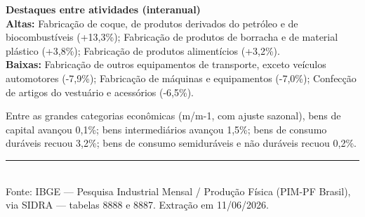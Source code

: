 \documentclass[11pt,a4paper]{article}
\begin{document}
\vspace{0.4em}
{\color{azulpim}\textbf{Destaques entre atividades (interanual)}}\\
\textbf{Altas:} Fabricação de coque, de produtos derivados do petróleo e de biocombustíveis (+13,3\%); Fabricação de produtos de borracha e de material plástico (+3,8\%); Fabricação de produtos alimentícios (+3,2\%).\\
\textbf{Baixas:} Fabricação de outros equipamentos de transporte, exceto veículos automotores (-7,9\%); Fabricação de máquinas e equipamentos (-7,0\%); Confecção de artigos do vestuário e acessórios (-6,5\%).

\vspace{0.3em}
Entre as grandes categorias econômicas (m/m-1, com ajuste sazonal), bens de capital avançou 0,1\%; bens intermediários avançou 1,5\%; bens de consumo duráveis recuou 3,2\%; bens de consumo semiduráveis e não duráveis recuou 0,2\%.

\vfill
{\color{cinzapim}\footnotesize
\rule{\linewidth}{0.4pt}\\
Fonte: IBGE — Pesquisa Industrial Mensal / Produção Física (PIM-PF Brasil), via SIDRA — tabelas 8888 e 8887.
Extração em 11/06/2026.
}
\end{document}
